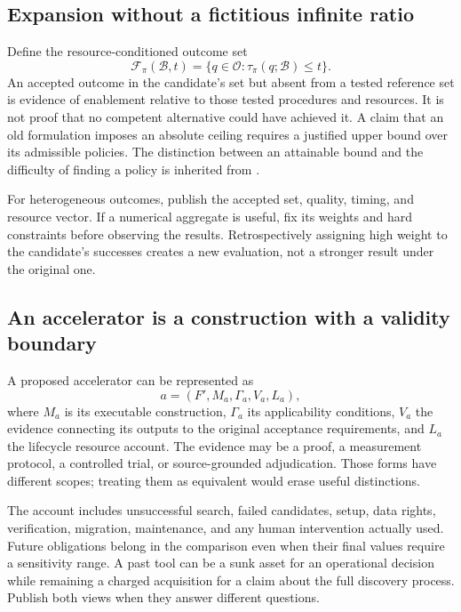 \documentclass[11pt,letterpaper]{article}
\theoremstyle{remark}\newtheorem{remark}{Remark}[section]
\newcommand{\F}{\mathcal F}
\begin{document}
\subsection{Expansion without a fictitious infinite ratio}
Define the resource-conditioned outcome set
\begin{equation}\label{eq:frontier}
 \F_\pi(\mathcal B,t)=
 \{q\in\mathcal O:\tau_\pi(q;\mathcal B)\le t\}.
\end{equation}
An accepted outcome in the candidate's set but absent from a tested reference set is evidence of enablement relative to those tested procedures and resources.
It is not proof that no competent alternative could have achieved it.
A claim that an old formulation imposes an absolute ceiling requires a justified upper bound over its admissible policies.
The distinction between an attainable bound and the difficulty of finding a policy is inherited from \citet{boucher2026ti}.

For heterogeneous outcomes, publish the accepted set, quality, timing, and resource vector.
If a numerical aggregate is useful, fix its weights and hard constraints before observing the results.
Retrospectively assigning high weight to the candidate's successes creates a new evaluation, not a stronger result under the original one.

\subsection{An accelerator is a construction with a validity boundary}
A proposed accelerator can be represented as
\begin{equation}
 a=(F',M_a,\Gamma_a,V_a,L_a),
\end{equation}
where $M_a$ is its executable construction, $\Gamma_a$ its applicability conditions,
$V_a$ the evidence connecting its outputs to the original acceptance requirements,
and $L_a$ the lifecycle resource account.
The evidence may be a proof, a measurement protocol, a controlled trial, or source-grounded adjudication.
Those forms have different scopes; treating them as equivalent would erase useful distinctions.

The account includes unsuccessful search, failed candidates, setup, data rights, verification, migration, maintenance, and any human intervention actually used.
Future obligations belong in the comparison even when their final values require a sensitivity range.
A past tool can be a sunk asset for an operational decision while remaining a charged acquisition for a claim about the full discovery process.
Publish both views when they answer different questions.
\end{document}
